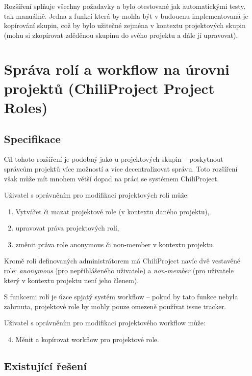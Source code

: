 \documentclass[thesis=B,czech]{FITthesis}[2012/05/02]
\begin{document}
Rozšíření splňuje všechny požadavky a bylo otestované jak automatickými
testy, tak manuálně. Jedna z funkcí která by mohla být v budoucnu
implementovaná je kopírování skupin, což by bylo užitečné zejména
v kontextu projektových skupin (mohu si zkopírovat zděděnou skupinu do
svého projektu a dále jí upravovat).

\section[Správa rolí a workflow na úrovni projektů]{Správa rolí a workflow na úrovni projektů (ChiliProject Project
Roles)}
\label{sec:project_roles}

\subsection{Specifikace}

Cíl tohoto rozšíření je podobný jako u projektových skupin -- poskytnout
správcům projektů více možností a více decentralizovat správu. Toto
rozšíření však může mít mnohem větší dopad na práci se systémem
ChiliProject.

Uživatel s oprávněním pro modifikaci projektových rolí může:

\begin{enumerate}[1.]
\item
  Vytvářet či mazat projektové role (v kontextu daného projektu),
\item
  upravovat práva projektových rolí,
\item
  změnit práva role anonymous či non-member v kontextu projektu.
\end{enumerate}
Kromě rolí definovaných administrátorem má ChiliProject navíc dvě
vestavěné role: \emph{anonymous} (pro nepřihlášeného uživatele) a
\emph{non-member} (pro uživatele který v kontextu projektu není jeho
členem).

S funkcemi rolí je úzce spjatý systém \gls{workflow} -- pokud by tato
funkce nebyla zahrnuta, projektové role by mohly pouze omezeně používat
issue tracker.

Uživatel s oprávněním pro modifikaci projektového \gls{workflow} může:

\begin{enumerate}[1.]
\setcounter{enumi}{3}
\item
  Měnit a kopírovat workflow pro projektové role.
\end{enumerate}
\subsection{Existující řešení}
\end{document}
